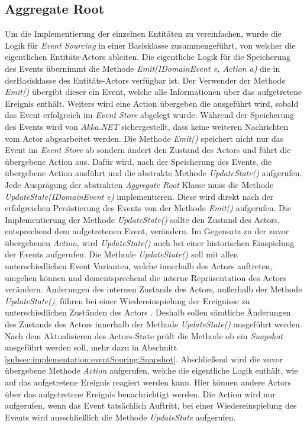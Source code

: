 \subsection{Aggregate Root}
Um die Implementierung der einzelnen Entitäten zu vereinfachen, wurde die Logik für \textit{Event Sourcing} in einer Basisklasse zusammengeführt, von welcher die eigentlichen Entitäts-Actors ableiten. 
Die eigentliche Logik für die Speicherung des Events übernimmt die Methode \textit{Emit(IDomainEvent e, Action a)} die in derBasisklasse des Entitäts-Actors verfügbar ist. Der Verwender der Methode \textit{Emit()} übergibt dieser ein Event, welche alle Informationen über das aufgetretene Ereignis enthält. Weiters wird eine Action übergeben die ausgeführt wird, sobald das Event erfolgreich im \textit{Event Store} abgelegt wurde. Während der Speicherung des Events wird von \textit{Akka.NET} sichergestellt, dass keine weiteren Nachrichten vom Actor abgearbeitet werden. Die Methode \textit{Emit()} speichert nicht nur das Event im \textit{Event Store} ab sondern ändert den Zustand des Actors und führt die übergebene Action aus. Dafür wird, nach der Speicherung des Events, die übergebene Action ausführt und die abstrakte Methode \textit{UpdateState()} aufgerufen. \\
Jede Ausprägung der abstrakten \textit{Aggregate Root} Klasse muss die Methode \textit{UpdateState(IDomainEvent e)} implementieren. Diese wird direkt nach der erfolgreichen Persistierung des Events von der Methode \textit{Emit()} aufgerufen. Die Implementierung der Methode \textit{UpdateState()} sollte den Zustand des Actors, entsprechend dem aufgetretenen Event, verändern. Im Gegensatz zu der zuvor übergebenen \textit{Action}, wird \textit{UpdateState()} auch bei einer historischen Einspielung der Events aufgerufen. Die Methode \textit{UpdateState()} soll mit allen unterschiedlichen Event Varianten, welche innerhalb des Actors auftreten, umgehen können und dementsprechend die interne Repräsentation des Actors verändern. Änderungen des internen Zustands des Actors, außerhalb der Methode \textit{UpdateState()}, führen bei einer Wiedereinspielung der Ereignisse zu unterschiedlichen Zuständen des Actors . Deshalb sollen sämtliche Änderungen des Zustands des Actors innerhalb der Methode \textit{UpdateState()} ausgeführt werden. \\
Nach dem Aktualisieren des Actors-State prüft die Methode ob ein \textit{Snapshot} ausgeführt werden soll, mehr dazu in Abschnitt \ref{subsec:implementation:eventSouring:Snapshot}. Abschließend wird die zuvor übergebene Methode \textit{Action} aufgerufen, welche die eigentliche Logik enthält, wie auf das aufgetretene Ereignis reagiert werden kann. Hier können andere Actors über das aufgetretene Ereignis benachrichtigt werden. Die Action wird nur aufgerufen, wenn das Event tatsächlich Auftritt, bei einer Wiedereinspielung des Events wird ausschließlich die Methode \textit{UpdateState} aufgerufen. \\ 

